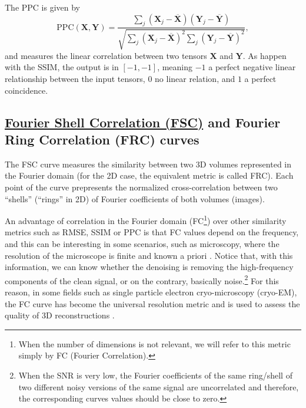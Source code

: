 \documentclass{article}
\begin{document}
The PPC is given
by
\begin{equation}
  \text{PPC}(\mathbf{X}, \mathbf{Y}) = \frac{\sum_j(\mathbf{X}_j - \overline{\mathbf{X}})(\mathbf{Y}_j - \overline{\mathbf{Y}})}{\sqrt{\sum_j (\mathbf{X}_j - \overline{\mathbf{X}})^2 \sum_j (\mathbf{Y}_j - \overline{\mathbf{Y}})^2}},
\end{equation}
and measures the linear correlation between two tensors $\mathbf{X}$
and $\mathbf{Y}$.  As happen with the SSIM, the output is in
$[-1, -1]$, meaning $-1$ a perfect negative linear relationship
between the input tensors, $0$ no linear relation, and $1$ a perfect
coincidence.


\subsection{\href{https://en.wikipedia.org/wiki/Fourier_shell_correlation}{Fourier
    Shell Correlation (FSC)} and Fourier Ring Correlation (FRC)
  curves}
\label{sec:fourier_correlation}

The FSC curve measures the similarity between two 3D volumes
represented in the Fourier domain \cite{verbeke2024self} (for the 2D
case, the equivalent metric is called FRC). Each point of the curve
prepresents the normalized cross-correlation between two ``shells''
(``rings'' in 2D) of Fourier coefficients of both volumes
(images). 

An advantage of correlation in the Fourier domain (FC\footnote{When
  the number of dimensions is not relevant, we will refer to this
  metric simply by FC (Fourier Correlation).}) over other similarity
metrics such as RMSE, SSIM or PPC is that FC values depend on the
frequency, and this can be interesting in some scenarios, such as
microscopy, where the resolution of the microscope is finite and known
a priori \cite{nieuwenhuizen2013measuring}. Notice that, with this
information, we can know whether the denoising is removing the
high-frequency components of the clean signal, or on the contrary,
basically noise.\footnote{When the SNR is very low, the Fourier
  coefficients of the same ring/shell of two different noisy versions
  of the same signal are uncorrelated and therefore, the corresponding
  curves values should be close to zero.}  For this reason, in some
fields such as single particle electron cryo-microscopy (cryo-EM), the
FC curve has become the universal resolution metric and is used to
assess the quality of 3D reconstructions
\cite{rosenthal2003optimal,scheres2012prevention}.
\end{document}
